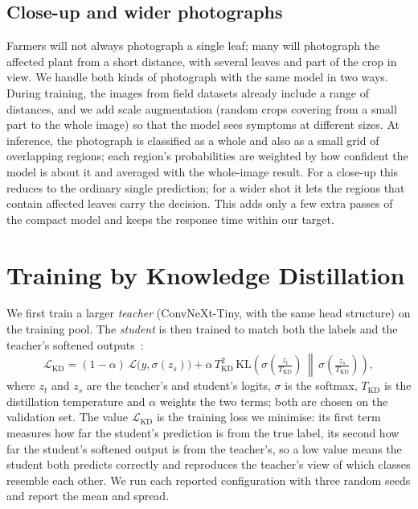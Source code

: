 \subsection{Close-up and wider photographs}
\label{sec:multiscale}
Farmers will not always photograph a single leaf; many will photograph the affected plant from a short distance, with several leaves and part of the crop in view. We handle both kinds of photograph with the same model in two ways. During training, the images from field datasets already include a range of distances, and we add scale augmentation (random crops covering from a small part to the whole image) so that the model sees symptoms at different sizes. At inference, the photograph is classified as a whole and also as a small grid of overlapping regions; each region's probabilities are weighted by how confident the model is about it and averaged with the whole-image result. For a close-up this reduces to the ordinary single prediction; for a wider shot it lets the regions that contain affected leaves carry the decision. This adds only a few extra passes of the compact model and keeps the response time within our target.

\section{Training by Knowledge Distillation}
\label{sec:kd}
We first train a larger \emph{teacher} (ConvNeXt-Tiny, with the same head structure) on the training pool. The \emph{student} is then trained to match both the labels and the teacher's softened outputs~\cite{hinton2015kd}:
\begin{equation}
\mathcal{L}_{\text{KD}} = (1-\alpha)\,\mathcal{L}\big(y, \sigma(z_s)\big) + \alpha\, T_{\text{KD}}^2\, \mathrm{KL}\!\left( \sigma\!\left(\tfrac{z_t}{T_{\text{KD}}}\right) \,\middle\|\, \sigma\!\left(\tfrac{z_s}{T_{\text{KD}}}\right) \right),
\label{eq:kd}
\end{equation}
where $z_t$ and $z_s$ are the teacher's and student's logits, $\sigma$ is the softmax, $T_{\text{KD}}$ is the distillation temperature and $\alpha$ weights the two terms; both are chosen on the validation set. The value $\mathcal{L}_{\text{KD}}$ is the training loss we minimise: its first term measures how far the student's prediction is from the true label, its second how far the student's softened output is from the teacher's, so a low value means the student both predicts correctly and reproduces the teacher's view of which classes resemble each other. We run each reported configuration with three random seeds and report the mean and spread.

